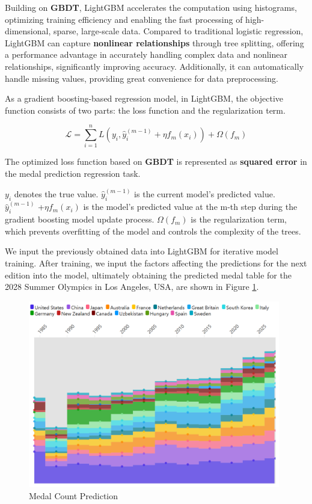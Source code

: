 \documentclass[12pt]{article}  %
\begin{document}
Building on \textbf{GBDT}, LightGBM accelerates the computation using histograms, optimizing training efficiency and enabling the fast processing of high-dimensional, sparse, large-scale data. Compared to traditional logistic regression, LightGBM can capture \textbf{nonlinear relationships} through tree splitting, offering a performance advantage in accurately handling complex data and nonlinear relationships, significantly improving accuracy. Additionally, it can automatically handle missing values, providing great convenience for data preprocessing.

As a gradient boosting-based regression model, in LightGBM, the objective function consists of two parts: the loss function and the regularization term.

\begin{equation}
	\mathcal{L} = \sum_{i=1}^{n} L(y_i, \hat{y}_i^{(m-1)} + \eta f_m(x_i)) + \Omega(f_m)
\end{equation}

The optimized loss function based on \textbf{GBDT}\cite{2} is represented as \textbf{squared error} in the medal prediction regression task.

$y_i$ denotes the true value.
$\hat{y}_i^{(m-1)}$ is the current model's predicted value.
$\hat{y}_i^{(m-1)}$ +$\eta f_m(x_i)$ is the model's predicted value at the m-th step during the gradient boosting model update process.
$\Omega(f_m)$ is the regularization term, which prevents overfitting of the model and controls the complexity of the trees.

We input the previously obtained data into LightGBM for iterative model training. After training, we input the factors affecting the predictions for the next edition into the model, ultimately obtaining the predicted medal table for the 2028 Summer Olympics in Los Angeles, USA, are shown in Figure \ref{fig:aa}.
\begin{figure}[H]
	\centering
	\includegraphics[width=11cm]{img/Predict.png}
	\caption{Medal Count Prediction}
	\label{fig:aa}
\end{figure}
\end{document}
